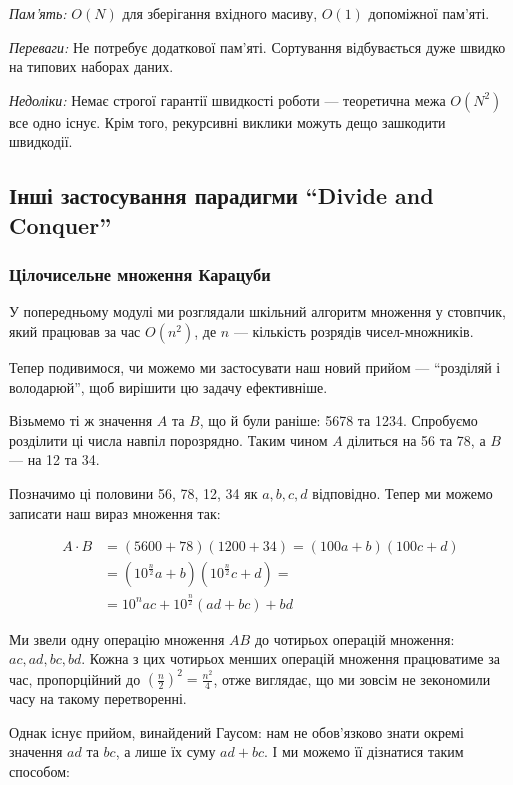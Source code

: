 \documentclass[12pt,a4paper]{report}
\begin{document}
\emph{Пам’ять:} \(O(N)\) для зберігання вхідного масиву, \(O(1)\) допоміжної пам’яті.

\emph{Переваги:} Не потребує додаткової пам’яті. Сортування відбувається дуже швидко на типових наборах даних.

\emph{Недоліки:} Немає строгої гарантії швидкості роботи --- теоретична межа \(O(N^2)\) все одно існує. Крім того, рекурсивні виклики можуть дещо зашкодити швидкодії.


\subsection{Інші застосування парадигми ``Divide and Conquer''}

\subsubsection*{Цілочисельне множення Карацуби}

У попередньому модулі ми розглядали шкільний алгоритм множення у стовпчик, який працював за час \(O(n^2)\), де \(n\) --- кількість розрядів чисел-множників.

Тепер подивимося, чи можемо ми застосувати наш новий прийом --- ``розділяй і володарюй'', щоб вирішити цю задачу ефективніше.

Візьмемо ті ж значення \(A\) та \(B\), що й були раніше: 5678 та 1234. Спробуємо розділити ці числа навпіл порозрядно. Таким чином \(A\) ділиться на 56 та 78, а \(B\) --- на 12 та 34.

Позначимо ці половини 56, 78, 12, 34 як \(a, b, c, d\) відповідно. Тепер ми можемо записати наш вираз множення так:

\begin{align*}
A \cdot B
& = (5600 + 78)(1200 + 34)
= (100a + b)(100c + d) \\
& = (10 ^ {\frac{n}{2}} a + b)(10 ^ {\frac{n}{2}} c + d) = \\
& = 10 ^ n a c + 10 ^ {\frac{n}{2}}(ad + bc) + bd
\end{align*}

Ми звели одну операцію множення \(AB\) до чотирьох операцій множення: \(ac, ad, bc, bd\). Кожна з цих чотирьох менших операцій множення працюватиме за час, пропорційний до \((\frac{n}{2})^2 = \frac{n^2}{4} \), отже виглядає, що ми зовсім не зекономили часу на такому перетворенні.

Однак існує прийом, винайдений Гаусом: нам не обов’язково знати окремі значення \(ad\) та \(bc\), а лише їх суму \(ad + bc\). І ми можемо її дізнатися таким способом:
\end{document}
